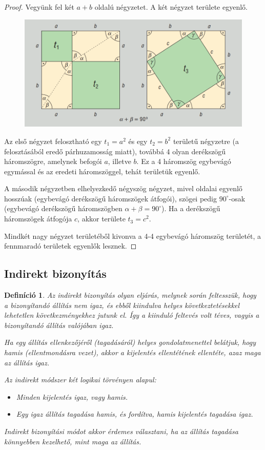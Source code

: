 \documentclass[12pt,a4paper]{article}
\newtheorem{definition}{Definíció} [section]
\begin{document}
\begin{proof}
Vegyünk fel két $a + b$ oldalú négyzetet. A két négyzet területe egyenlő.
\begin{figure}[h!]
\centering
\includegraphics[scale=0.2]{geometry/pitagorasz}
\end{figure}

Az első négyzet felosztható egy $t_1 = a^2$ és egy $t_2 = b^2$ területű négyzetre (a felosztásából eredő párhuzamosság miatt), továbbá 4 olyan derékszögű háromszögre, amelynek befogói $a$, illetve $b$. Ez a 4 háromszög egybevágó egymással és az eredeti háromszöggel, tehát területük egyenlő.

A második négyzetben elhelyezkedő négyszög négyzet, mivel oldalai egyenlő hosszúak (egybevágó derékszögű háromszögek átfogói), szögei pedig $90^\circ$-osak (egybevágó derékszögű háromszögben $\alpha + \beta = 90^\circ$). Ha a derékszögű háromszögek átfogója $c$, akkor területe $t_3 = c^2$.

Mindkét nagy négyzet területéből kivonva a 4-4 egybevágó háromszög területét, a fennmaradó területek egyenlők lesznek.
\end{proof}
\newpage
\subsection{Indirekt bizonyítás}
\begin{definition}
Az indirekt bizonyítás olyan eljárás, melynek során feltesszük, hogy a bizonyítandó állítás nem igaz, és ebből kiindulva helyes következtetésekkel lehetetlen következményekhez jutunk el. Így a kiinduló feltevés volt téves, vagyis a bizonyítandó állítás valójában igaz.

Ha egy állítás ellenkezőjéről (tagadásáról) helyes gondolatmenettel belátjuk, hogy hamis (ellentmondásra vezet), akkor a kijelentés ellentétének ellentéte, azaz maga az állítás igaz.

Az indirekt módszer két logikai törvényen alapul:
\begin{itemize}
\item Minden kijelentés igaz, vagy hamis.
\item Egy igaz állítás tagadása hamis, és fordítva, hamis kijelentés tagadása igaz.
\end{itemize}
Indirekt bizonyítási módot akkor érdemes választani, ha az állítás tagadása könnyebben kezelhető, mint maga az állítás.
\end{definition}
\end{document}
